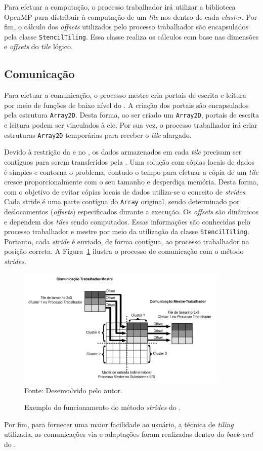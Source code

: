 Para efetuar a computação, o processo trabalhador irá utilizar a biblioteca
OpenMP para distribuir à computação de um \textit{tile} nos \pes dentro de cada
\textit{cluster}. Por fim, o cálculo dos \textit{offsets} utilizados pelo processo
trabalhador são encapsulados pela classe \texttt{StencilTiling}. Essa classe
realiza os cálculos com base nas dimensões e \textit{offsets} do \textit{tile}
lógico.

\subsection{Comunicação}

Para efetuar a comunicação, o processo mestre cria portais de escrita e leitura
por meio de funções de baixo nível do \mppa. A criação dos portais são encapsulados pela
estrutura \texttt{Array2D}. Desta forma, ao ser criado um \texttt{Array2D},
portais de escrita e leitura podem ser vinculados à ele. Por sua vez, o
processo trabalhador irá criar estruturas \texttt{Array2D} temporárias para
receber o \textit{tile} alargado.

Devido à restrição da \api e \noc no \mppa, os dados armazenados em cada
\textit{tile} precisam ser contíguos para serem transferidos pela \noc. Uma
solução com cópias locais de dados é simples e contorna o problema, contudo o
tempo para efetuar a cópia de um \textit{tile} cresce proporcionalmente com o
seu tamanho e desperdiça memória. Desta forma, com o objetivo de evitar cópias
locais de dados utiliza-se o conceito de \textit{strides}. Cada stride é uma
parte contígua do \texttt{Array} original, sendo determinado por deslocamentos
(\textit{offsets}) especificados durante a execução. Os \textit{offsets} são
dinâmicos e dependem dos \textit{tiles} sendo computados. Essas informações são
conhecidas pelo processo trabalhador e mestre por meio da
utilização da classe \texttt{StencilTiling}. Portanto, cada \textit{stride}
é enviado, de forma contígua, ao processo trabalhador na posição correta. A
Figura~\ref{fig:strides} ilustra o processo de comunicação com o método
\textit{strides}.

\begin{figure}[!h]
	\centering
	\caption{Exemplo do funcionamento do método \textit{strides} do \mppa.}
	\includegraphics[width=0.9\textwidth]{figs/stridesImage.pdf} \\
    Fonte: Desenvolvido pelo autor.
	\label{fig:strides}
\end{figure}

Por fim, para fornecer uma maior facilidade ao usuário, a técnica de
\textit{tiling} utilizada, as comunicações via \noc e adaptações foram
realizadas dentro do \textit{back-end} do \pskel.
